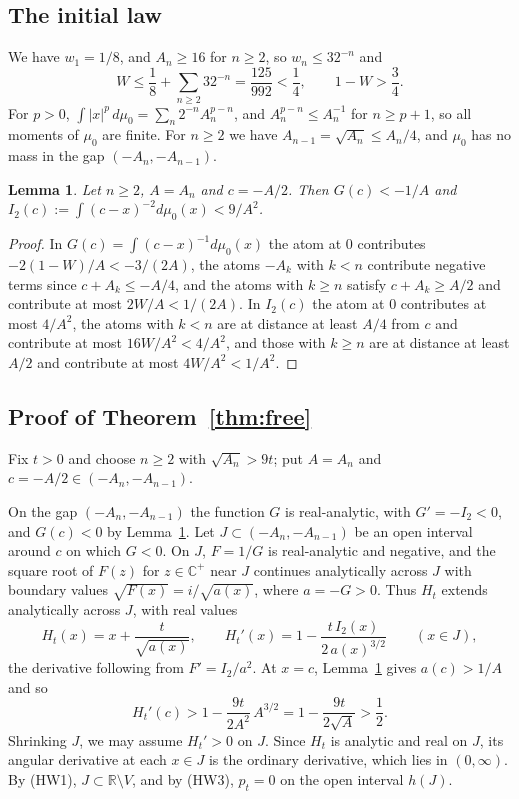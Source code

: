 \documentclass[11pt]{amsart}
\newtheorem{lemma}[theorem]{Lemma}
\theoremstyle{definition}
\theoremstyle{remark}
\numberwithin{equation}{section}
\newcommand{\R}{\mathbb{R}}
\newcommand{\Hp}{\mathbb{C}^+}
\begin{document}
\subsection{The initial law}
We have $w_1=1/8$, and $A_n\ge16$ for $n\ge2$, so $w_n\le32^{-n}$ and
\begin{equation}\label{eq:W}
W\le\frac18+\sum_{n\ge2}32^{-n}=\frac{125}{992}<\frac14,\qquad 1-W>\frac34 .
\end{equation}
For $p>0$, $\int|x|^p\,d\mu_0=\sum_n2^{-n}A_n^{p-n}$, and $A_n^{p-n}\le A_n^{-1}$ for $n\ge p+1$, so all moments of $\mu_0$ are finite. For $n\ge2$ we have $A_{n-1}=\sqrt{A_n}\le A_n/4$, and $\mu_0$ has no mass in the gap $(-A_n,-A_{n-1})$.

\begin{lemma}\label{lem:gap}
Let $n\ge2$, $A=A_n$ and $c=-A/2$. Then $G(c)<-1/A$ and $I_2(c):=\int(c-x)^{-2}d\mu_0(x)<9/A^2$.
\end{lemma}

\begin{proof}
In $G(c)=\int(c-x)^{-1}d\mu_0(x)$ the atom at $0$ contributes $-2(1-W)/A<-3/(2A)$, the atoms $-A_k$ with $k<n$ contribute negative terms since $c+A_k\le-A/4$, and the atoms with $k\ge n$ satisfy $c+A_k\ge A/2$ and contribute at most $2W/A<1/(2A)$. In $I_2(c)$ the atom at $0$ contributes at most $4/A^2$, the atoms with $k<n$ are at distance at least $A/4$ from $c$ and contribute at most $16W/A^2<4/A^2$, and those with $k\ge n$ are at distance at least $A/2$ and contribute at most $4W/A^2<1/A^2$.
\end{proof}

\subsection{Proof of Theorem~\ref{thm:free}}
Fix $t>0$ and choose $n\ge2$ with $\sqrt{A_n}>9t$; put $A=A_n$ and $c=-A/2\in(-A_n,-A_{n-1})$.

On the gap $(-A_n,-A_{n-1})$ the function $G$ is real-analytic, with $G'=-I_2<0$, and $G(c)<0$ by Lemma~\ref{lem:gap}. Let $J\subset(-A_n,-A_{n-1})$ be an open interval around $c$ on which $G<0$. On $J$, $F=1/G$ is real-analytic and negative, and the square root of $F(z)$ for $z\in\Hp$ near $J$ continues analytically across $J$ with boundary values $\sqrt{F(x)}=i/\sqrt{a(x)}$, where $a=-G>0$. Thus $H_t$ extends analytically across $J$, with real values
\[
H_t(x)=x+\frac{t}{\sqrt{a(x)}},\qquad H_t'(x)=1-\frac{t\,I_2(x)}{2\,a(x)^{3/2}}\qquad(x\in J),
\]
the derivative following from $F'=I_2/a^2$. At $x=c$, Lemma~\ref{lem:gap} gives $a(c)>1/A$ and so
\[
H_t'(c)>1-\frac{9t}{2A^2}\,A^{3/2}=1-\frac{9t}{2\sqrt A}>\frac12 .
\]
Shrinking $J$, we may assume $H_t'>0$ on $J$. Since $H_t$ is analytic and real on $J$, its angular derivative at each $x\in J$ is the ordinary derivative, which lies in $(0,\infty)$. By (HW1), $J\subset\R\setminus V$, and by (HW3), $p_t=0$ on the open interval $h(J)$.
\end{document}
